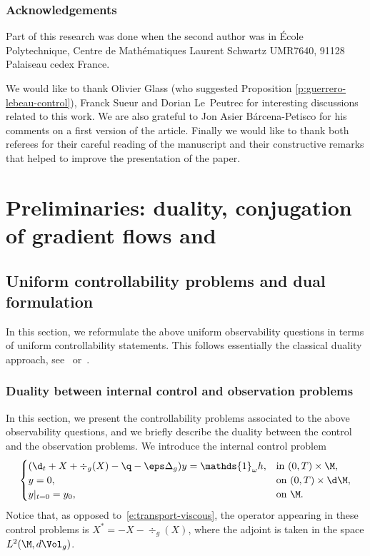 \subsubsection*{Acknowledgements}
Part of this research was done when the second author was in École Polytechnique, Centre de Mathématiques Laurent Schwartz UMR7640, 91128 Palaiseau cedex France.

We would like to thank Olivier Glass (who suggested Proposition \ref{p:guerrero-lebeau-control}), Franck Sueur and Dorian Le~Peutrec for interesting discussions related to this work.
We are also grateful to Jon Asier Bárcena-Petisco for his comments on a first version of the article. Finally we would like to thank both referees for their careful reading of the manuscript and their constructive remarks that helped to improve the presentation of the paper.

\section{Preliminaries: duality, conjugation of gradient flows and \pGCC}
\label{s:preliminaires}

\subsection{Uniform controllability problems and dual formulation}

In this section, we reformulate the above uniform observability questions in terms of uniform controllability statements. This follows essentially the classical duality approach, see~\cite{DR:77} or~\cite[Chap.\,2.3]{Cor:book}.

\subsubsection{Duality between internal control and observation problems}
\label{s:obs-cont}
In this section, we present the controllability problems associated to the above observability questions, and we briefly describe the duality between the control and the observation problems.
We introduce the internal control problem
\begin{equation}
\label{e:transport-viscous-control-internal}
\begin{cases}
(\d_t + X + \div_g(X) -\q - \eps \Delta_g ) y = \mathds{1}_\omega h, & \text{in } (0,T)\times \M, \\
y = 0, & \text{on } (0,T)\times \d\M, \\
y|_{t=0} = y_0, & \text{on } \M.
\end{cases}
\end{equation}
Notice that, as opposed to~\eqref{e:transport-viscous}, the operator appearing in these control problems is $X^* = -X - \div_{g}(X)$, where the adjoint is taken in the space $L^2(\M, d\Vol_g)$.

